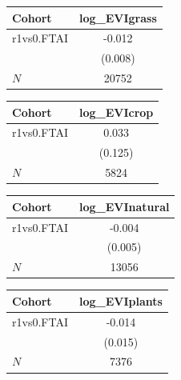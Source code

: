 {
\def\sym#1{\ifmmode^{#1}\else\(^{#1}\)\fi}
\begin{tabular}{l*{1}{c}}
\toprule
Cohort    &log\_EVIgrass   \\
\midrule
r1vs0.FTAI&   -0.012   \\
          &  (0.008)   \\
\midrule
\(N\)     &    20752   \\
\bottomrule
\end{tabular}
}
{
\def\sym#1{\ifmmode^{#1}\else\(^{#1}\)\fi}
\begin{tabular}{l*{1}{c}}
\toprule
Cohort    &log\_EVIcrop   \\
\midrule
r1vs0.FTAI&    0.033   \\
          &  (0.125)   \\
\midrule
\(N\)     &     5824   \\
\bottomrule
\end{tabular}
}
{
\def\sym#1{\ifmmode^{#1}\else\(^{#1}\)\fi}
\begin{tabular}{l*{1}{c}}
\toprule
Cohort    &log\_EVInatural   \\
\midrule
r1vs0.FTAI&   -0.004   \\
          &  (0.005)   \\
\midrule
\(N\)     &    13056   \\
\bottomrule
\end{tabular}
}
{
\def\sym#1{\ifmmode^{#1}\else\(^{#1}\)\fi}
\begin{tabular}{l*{1}{c}}
\toprule
Cohort    &log\_EVIplants   \\
\midrule
r1vs0.FTAI&   -0.014   \\
          &  (0.015)   \\
\midrule
\(N\)     &     7376   \\
\bottomrule
\end{tabular}
}
